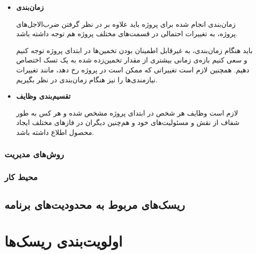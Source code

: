 \begin{itemize}
	
	
\item 
\textbf{زمان‌بندی}


زمان‌بندی انجام شده برای پروژه باید علاوه بر در نظر گرفتن ضرب‌الاجل‌های پروژه، به تغییرات احتمالی در قسمت‌های مختلف پروژه هم توجه داشته باشد.

باید هنگام زمان‌بندی، به غیرقابل اطمینان بودن تخمین‌ها در ابتدای پروژه توجه کنیم و سعی کنیم بازه‌ی زمانی بیشتری از مقدار تخمین‌زده شده به یک تسک اختصاص دهیم. همچنین لازم است تغییراتی که ممکن است در پروژه رخ دهد، مانند تغییرات نیازمندی‌ها را نیز هنگام زمان‌بندی در نظر بگیریم.


\item 
\textbf{تقسیم‌بندی وظایف‌}


	لازم است وظایف هر شخص در ابتدای پروژه مشخص شده و هر کس به طور شفاف از نقش و مسئولیت‌های خود و هم‌چنین دیگران در فازهای مختلف ایجاد محصول اطلاع داشته باشد.

	
\end{itemize}

\subsubsection{روش‌های مدیریت}

\subsubsection{محیط کار}


\subsection{ریسک‌های مربوط به محدودیت‌های برنامه}


\section{اولویت‌بندی ریسک‌ها}

